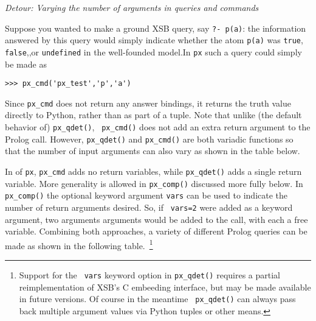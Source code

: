 \begin{example} \rm {\it Detour: Varying the number of arguments in queries and commands}


  Suppose you wanted to make a ground XSB query, say {\tt ?- p(a)}:
  the information answered by this query would simply indicate whether
  the atom {\tt p(a)} was {\tt true}, {\tt false},,or {\tt undefined}
  in the well-founded model.In {\tt px} such a query could simply be
  made as

\begin{verbatim}  
>>> px_cmd('px_test','p','a')  
\end{verbatim}  

Since {\tt px\_cmd} does not return any answer bindings, it returns
the truth value directly to Python, rather than as part of a tuple.
Note that unlike (the default behavior of) {\tt px\_qdet()}, {\tt
  px\_cmd()} does not add an extra return argument to the Prolog call.
However, {\tt px\_qdet()} and {\tt px\_cmd()} are both variadic
functions so that the number of input arguments can also vary as shown
in the table below.

In \pxversion{} of {\tt px}, {\tt px\_cmd} adds no return variables,
while {\tt px\_qdet()} adds a single return variable.  More generality
is allowed in {\tt px\_comp()} discussed more fully below.  In {\tt
  px\_comp()} the optional keyword argument {\tt vars} can be used to
  indicate the number of return arguments desired.  So, if {\tt
    vars=2} were added as a keyword argument, two arguments arguments
  would be added to the call, with each a free variable.  Combining
  both approaches, a variety of different Prolog queries can be made
  as shown in the following table.~\footnote{Support for the {\tt
      vars} keyword option in {\tt px\_qdet()} requires a partial
    reimplementation of XSB's C embeeding interface, but may be made
    available in future versions.  Of course in the meantime {\tt
      px\_qdet()} can always pass back multiple argument values via
    Python tuples or other means.}


\end{example}
